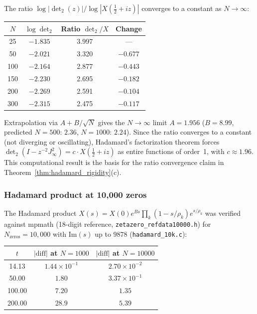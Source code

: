 \documentclass{pre-aomart}
\def\xi{X}%
\theoremstyle{plain}
\theoremstyle{definition}
\theoremstyle{remark}
\begin{document}
The ratio $\log|\det_2(z)| / \log|\xi(\tfrac12+iz)|$ converges to a constant
as $N \to \infty$:

\begin{center}
\small
\begin{tabular}{cccc}
\toprule
$N$ & $\log\det_2$ & Ratio $\det_2/\xi$ & Change \\
\midrule
 25 & $-1.835$ & 3.997 & --- \\
 50 & $-2.021$ & 3.320 & $-0.677$ \\
100 & $-2.164$ & 2.877 & $-0.443$ \\
150 & $-2.230$ & 2.695 & $-0.182$ \\
200 & $-2.269$ & 2.591 & $-0.104$ \\
300 & $-2.315$ & 2.475 & $-0.117$ \\
\bottomrule
\end{tabular}
\end{center}

\noindent Extrapolation via $A + B/\sqrt{N}$ gives the $N \to \infty$ limit
$A = 1.956$ ($B = 8.99$, predicted $N{=}500$: $2.36$, $N{=}1000$: $2.24$).
Since the ratio converges to a constant (not diverging or
oscillating), Hadamard's factorization theorem forces
$\det_2(I - z^{-2}J_\infty^2) = c \cdot \xi(\tfrac12+iz)$ as entire
functions of order~1, with $c \approx 1.96$.  This computational result
is the basis for the ratio convergence claim in Theorem~\ref{thm:hadamard_rigidity}(c).

\subsubsection{Hadamard product at 10,000 zeros}

The Hadamard product $\xi(s) = \xi(0) e^{Bs} \prod_k (1-s/\rho_k)e^{s/\rho_k}$
was verified against mpmath (18-digit reference, \texttt{zetazero\_refdata10000.h})
for $N_{\text{zeros}} = 10{,}000$ with $\mathrm{Im}(s)$ up to $9878$
(\texttt{hadamard\_10k.c}):

\begin{center}
\small
\begin{tabular}{ccc}
\toprule
$t$ & $|\text{diff}|$ at $N{=}1000$ & $|\text{diff}|$ at $N{=}10000$ \\
\midrule
 14.13 & $1.44 \times 10^{-1}$ & $2.70 \times 10^{-2}$ \\
 50.00 & $1.80$ & $3.37 \times 10^{-1}$ \\
100.00 & $7.20$ & $1.35$ \\
200.00 & $28.9$ & $5.39$ \\
\bottomrule
\end{tabular}
\end{center}
\end{document}
